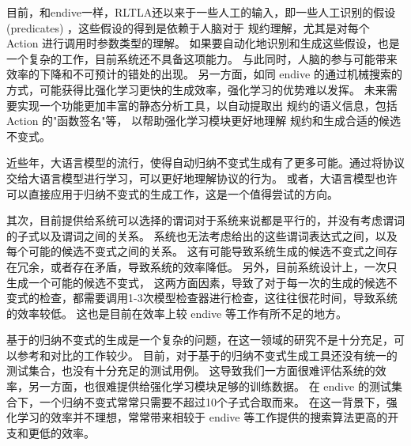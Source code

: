 目前，和endive一样，RLTLA还以来于一些人工的输入，即一些人工识别的假设(predicates)
，这些假设的得到是依赖于人脑对于 \TLA 规约理解，尤其是对每个 Action 进行调用时参数类型的理解。
如果要自动化地识别和生成这些假设，也是一个复杂的工作，目前系统还不具备这项能力。
与此同时，人脑的参与可能带来效率的下降和不可预计的错处的出现。
另一方面，如同 endive 的通过机械搜索的方式，可能获得比强化学习更快的生成效率，强化学习的优势难以发挥。
未来需要实现一个功能更加丰富的静态分析工具，以自动提取出 \TLA 规约的语义信息，包括 Action 的"函数签名"等，
以帮助强化学习模块更好地理解 \TLA 规约和生成合适的候选不变式。

近些年，大语言模型的流行，使得自动归纳不变式生成有了更多可能。通过将协议交给大语言模型进行学习，可以更好地理解协议的行为。
或者，大语言模型也许可以直接应用于归纳不变式的生成工作，这是一个值得尝试的方向。

其次，目前提供给系统可以选择的谓词对于系统来说都是平行的，并没有考虑谓词的子式以及谓词之间的关系。
系统也无法考虑给出的这些谓词表达式之间，以及每个可能的候选不变式之间的关系。
这有可能导致系统生成的候选不变式之间存在冗余，或者存在矛盾，导致系统的效率降低。
另外，目前系统设计上，一次只生成一个可能的候选不变式，
这两方面因素，导致了对于每一次的生成的候选不变式的检查，都需要调用1-3次模型检查器进行检查，这往往很花时间，导致系统的效率较低。
这也是目前在效率上较 endive 等工作有所不足的地方。

基于\TLA 的归纳不变式的生成是一个复杂的问题，在这一领域的研究不是十分充足，可以参考和对比的工作较少。
目前，对于基于\TLA 的归纳不变式生成工具还没有统一的测试集合，也没有十分充足的测试用例。
这导致我们一方面很难评估系统的效率，另一方面，也很难提供给强化学习模块足够的训练数据。
在 endive 的测试集合下，一个归纳不变式常常只需要不超过10个子式合取而来。
在这一背景下，强化学习的效率并不理想，常常带来相较于 endive 等工作提供的搜索算法更高的开支和更低的效率。

